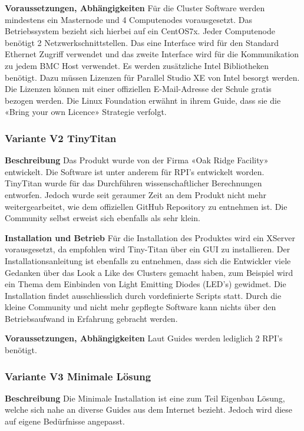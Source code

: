 \textbf{Voraussetzungen, Abhängigkeiten}\newline
Für die Cluster Software werden mindestens ein Masternode und 4 Computenodes vorausgesetzt. Das Betriebssystem bezieht sich hierbei auf ein CentOS7x. Jeder Computenode benötigt 2 Netzwerkschnittstellen. Das eine Interface wird für den Standard Ethernet Zugriff verwendet und das zweite Interface wird für die Kommunikation zu jedem BMC Host verwendet. Es werden zusätzliche Intel Bibliotheken benötigt. Dazu müssen Lizenzen für Parallel Studio XE von Intel besorgt werden. Die Lizenzen können mit einer offiziellen E-Mail-Adresse der Schule gratis bezogen werden. Die Linux Foundation erwähnt in ihrem Guide, dass sie die «Bring your own Licence» Strategie verfolgt.

\subsubsection{Variante V2 \flqq TinyTitan\frqq}
\textbf{Beschreibung}\newline
Das Produkt wurde von der Firma «Oak Ridge Facility» entwickelt. Die Software ist unter anderem für RPI’s entwickelt worden. TinyTitan wurde für das Durchführen wissenschaftlicher Berechnungen entworfen. Jedoch wurde seit geraumer Zeit an dem Produkt nicht mehr weitergearbeitet, wie dem offiziellen GitHub Repository zu entnehmen ist. Die Community selbst erweist sich ebenfalls als sehr klein. 

\textbf{Installation und Betrieb}\newline
Für die Installation des Produktes wird ein XServer vorausgesetzt, da empfohlen wird Tiny-Titan über ein GUI zu installieren. Der Installationsanleitung ist ebenfalls zu entnehmen, dass sich die Entwickler viele Gedanken über das Look a Like des Clusters gemacht haben, zum Beispiel wird ein Thema dem Einbinden von Light Emitting Diodes (LED’s) gewidmet. Die Installation findet ausschliesslich durch vordefinierte Scripts statt. Durch die kleine Community und nicht mehr gepflegte Software kann nichts über den Betriebsaufwand in Erfahrung gebracht werden.

\textbf{Voraussetzungen, Abhängigkeiten}\newline
Laut Guides werden lediglich 2 RPI’s benötigt.

\subsubsection{Variante V3 \flqq Minimale Lösung\frqq}
\textbf{Beschreibung}\newline
Die Minimale Installation ist eine zum Teil Eigenbau Lösung, welche sich nahe an diverse Guides aus dem Internet bezieht. Jedoch wird diese auf eigene Bedürfnisse angepasst.

